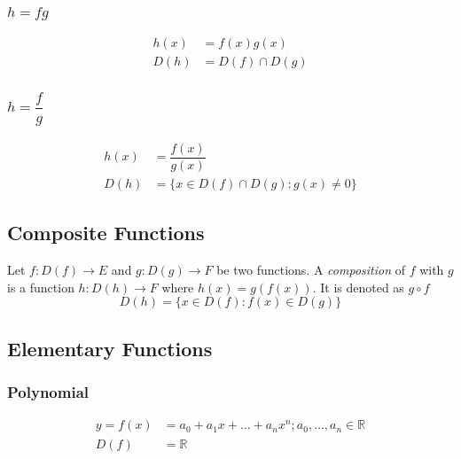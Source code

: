 \documentclass[fleqn]{article}
\begin{document}
\subsubsection{$h = f g$}

\begin{align}
	h(x) &= f(x) g(x) \label{product of functions}\\
	D(h) &= D(f) \cap D(g) \label{domain of product of functions}
\end{align}

\subsubsection{$h = \dfrac{f}{g}$}

\begin{align}
h(x) &= \dfrac{f(x)}{g(x)} \label{division of functions}\\
D(h) &= \{x \in D(f) \cap D(g) : g(x) \neq 0\} \label{domain of division of functions}
\end{align}

\subsection{Composite Functions}

Let $f : D(f) \rightarrow E$ and $g : D(g) \rightarrow F$ be two functions. A \emph{composition} of $f$ with $g$ is a function $h : D(h) \rightarrow F$ where $h(x) = g(f(x))$. It is denoted as $g \circ f$\\
\begin{equation}
	D(h) = \{x \in D(f) : f(x) \in D(g)\} \label{domain of composite functions} 
\end{equation}

\subsection{Elementary Functions}

\subsubsection{Polynomial}

\begin{align}
	y = f(x) &= a_0 + a_1 x + \dots + a_n x^n ; a_0, \dots, a_n \in \mathbb{R} \label{polynomial} \\
	D(f) &= \mathbb{R} \label{domain of polynomial}
\end{align}
\end{document}

